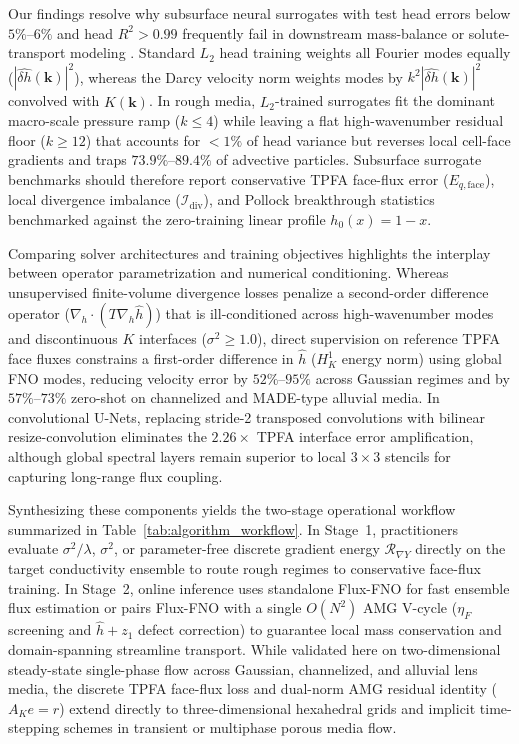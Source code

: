 \documentclass[preprint,12pt,authoryear]{elsarticle}
\begin{document}
Our findings resolve why subsurface neural surrogates with test head errors below $5\%$--$6\%$ and head $R^2 > 0.99$ frequently fail in downstream mass-balance or solute-transport modeling \citep{fuks2020limits,wang2020tgnn,massbal2024}. Standard $L_2$ head training weights all Fourier modes equally ($|\widehat{\delta h}(\mathbf{k})|^2$), whereas the Darcy velocity norm weights modes by $k^2 |\widehat{\delta h}(\mathbf{k})|^2$ convolved with $\widehat{K}(\mathbf{k})$. In rough media, $L_2$-trained surrogates fit the dominant macro-scale pressure ramp ($k \le 4$) while leaving a flat high-wavenumber residual floor ($k \ge 12$) that accounts for $<1\%$ of head variance but reverses local cell-face gradients and traps $73.9\%$--$89.4\%$ of advective particles. Subsurface surrogate benchmarks should therefore report conservative TPFA face-flux error ($E_{q,\text{face}}$), local divergence imbalance ($\mathcal{I}_{\text{div}}$), and Pollock breakthrough statistics benchmarked against the zero-training linear profile $h_0(x) = 1 - x$.

Comparing solver architectures and training objectives highlights the interplay between operator parametrization and numerical conditioning. Whereas unsupervised finite-volume divergence losses \citep{awr2025fvfno} penalize a second-order difference operator ($\nabla_h\cdot(T\nabla_h\hat{h})$) that is ill-conditioned across high-wavenumber modes and discontinuous $K$ interfaces ($\sigma^2 \ge 1.0$), direct supervision on reference TPFA face fluxes constrains a first-order difference in $\hat{h}$ ($H^1_K$ energy norm) using global FNO modes, reducing velocity error by $52\%$--$95\%$ across Gaussian regimes and by $57\%$--$73\%$ zero-shot on channelized and MADE-type alluvial media. In convolutional U-Nets, replacing stride-2 transposed convolutions with bilinear resize-convolution eliminates the $2.26\times$ TPFA interface error amplification, although global spectral layers remain superior to local $3 \times 3$ stencils for capturing long-range flux coupling.

Synthesizing these components yields the two-stage operational workflow summarized in Table~\ref{tab:algorithm_workflow}. In Stage~1, practitioners evaluate $\sigma^2/\lambda$, $\sigma^2$, or parameter-free discrete gradient energy $\mathcal{R}_{\nabla Y}$ directly on the target conductivity ensemble to route rough regimes to conservative face-flux training. In Stage~2, online inference uses standalone Flux-FNO for fast ensemble flux estimation or pairs Flux-FNO with a single $O(N^2)$ AMG V-cycle ($\eta_F$ screening and $\hat{h} + z_1$ defect correction) to guarantee local mass conservation and domain-spanning streamline transport. While validated here on two-dimensional steady-state single-phase flow across Gaussian, channelized, and alluvial lens media, the discrete TPFA face-flux loss and dual-norm AMG residual identity ($A_K e = r$) extend directly to three-dimensional hexahedral grids and implicit time-stepping schemes in transient or multiphase porous media flow.
\end{document}
